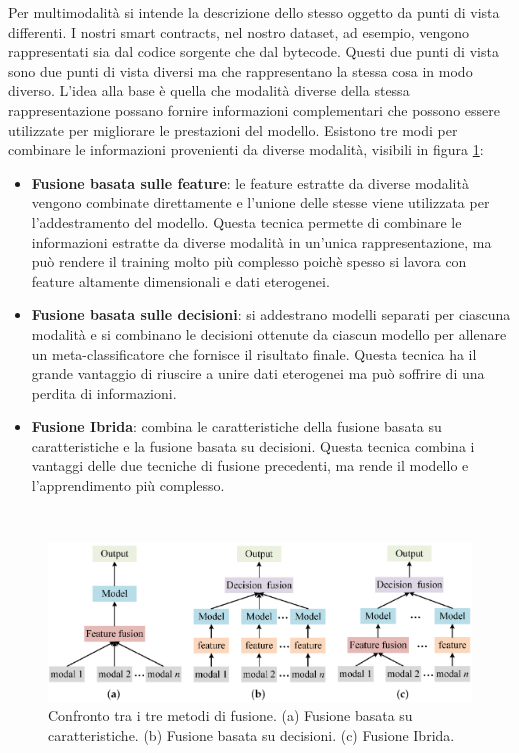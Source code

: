 \documentclass[../../Thesis.tex]{subfiles}
\begin{document}
Per multimodalità si intende la descrizione dello stesso oggetto da punti di vista differenti. I nostri smart contracts, nel nostro dataset, ad esempio, vengono rappresentati sia dal codice sorgente che dal bytecode. Questi due punti di vista sono due punti di vista diversi ma che rappresentano la stessa cosa in modo diverso. L'idea alla base è quella che modalità diverse della stessa rappresentazione possano fornire informazioni complementari che possono essere utilizzate per migliorare le prestazioni del modello. Esistono tre modi per combinare le informazioni provenienti da diverse modalità, visibili in figura \ref{fig:fusion_methods}:
\begin{itemize}
    \item \textbf{Fusione basata sulle feature}: le feature estratte da diverse modalità vengono combinate direttamente e l'unione delle stesse viene utilizzata per l'addestramento del modello. Questa tecnica permette di combinare le informazioni estratte da diverse modalità in un'unica rappresentazione, ma può rendere il training molto più complesso poichè spesso si lavora con feature altamente dimensionali e dati eterogenei.
    \item \textbf{Fusione basata sulle decisioni}: si addestrano modelli separati per ciascuna modalità e si combinano le decisioni ottenute da ciascun modello per allenare un meta-classificatore che fornisce il risultato finale. Questa tecnica ha il grande vantaggio di riuscire a unire dati eterogenei ma può soffrire di una perdita di informazioni.
    \item \textbf{Fusione Ibrida}: combina le caratteristiche della fusione basata su caratteristiche e la fusione basata su decisioni. Questa tecnica combina i vantaggi delle due tecniche di fusione precedenti, ma rende il modello e l'apprendimento più complesso.
\end{itemize} 
\
\begin{figure}[h]
    \centering
    \includegraphics[width=\textwidth]{../../img/fusion_methods.png}
    \caption{Confronto tra i tre metodi di fusione. (a) Fusione basata su caratteristiche. (b) Fusione basata su decisioni. (c) Fusione Ibrida.}
    \label{fig:fusion_methods}
\end{figure}
\end{document}
